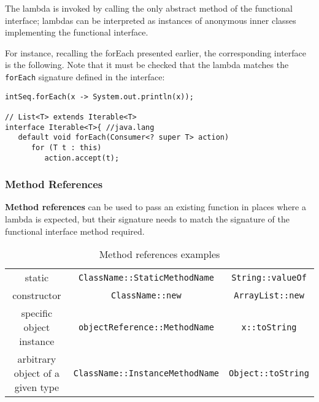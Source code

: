 The lambda is invoked by calling the only abstract method
of the functional interface;
lambdas can be interpreted as instances of anonymous
inner classes implementing the functional interface.

For instance, recalling the forEach presented earlier, the corresponding interface is the following.
Note that it must be checked that the lambda matches the \lstinline|forEach| signature defined in the interface:
\begin{lstlisting}
intSeq.forEach(x -> System.out.println(x));

// List<T> extends Iterable<T>
interface Iterable<T>{ //java.lang
   default void forEach(Consumer<? super T> action)
      for (T t : this)
         action.accept(t);
\end{lstlisting}

\subsubsection{Method References}
\textbf{Method references} can be used to pass an existing
function in places where a lambda is expected,
but their signature needs to
match the signature of the functional interface method required.
\begin{table}[htbp]
   \centering
   \begin{tabular}{|c|c|c|}
      \hline
      static  & \lstinline|ClassName::StaticMethodName| & \lstinline|String::valueOf|\\
      constructor &  \lstinline|ClassName::new| & \lstinline|ArrayList::new|\\
      specific object instance & \lstinline|objectReference::MethodName| & \lstinline|x::toString|\\
      arbitrary object of a given type & \lstinline|ClassName::InstanceMethodName| & \lstinline|Object::toString|\\
      \hline
   \end{tabular}
   \caption{Method references examples}
   \label{tab:method_references}
\end{table}